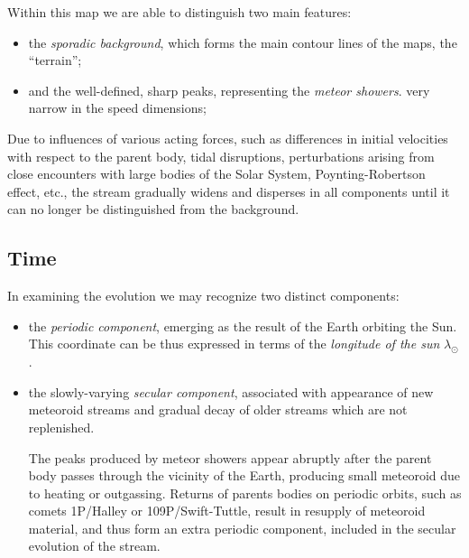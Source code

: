     \citep{balaz+2020}

    Within this map we are able to distinguish two main features:
    \begin{itemize}
        \item the \emph{sporadic background}, which forms the main contour lines of the maps, the ``terrain'';
        \item and the well-defined, sharp peaks, representing the \emph{meteor showers}. 
            very narrow in the speed dimensions;
    \end{itemize}
        
    Due to influences of various acting forces, such as differences
    in initial velocities with respect to the parent body, tidal disruptions, 
    perturbations arising from close encounters with large bodies of the Solar System,
    Poynting-Robertson effect, etc., the stream
    gradually widens and disperses in all components until it can no longer be distinguished from the background.

    \subsection{Time} \label{i}
        In examining the evolution we may recognize two distinct components:
        \begin{itemize}
            \item the \emph{periodic component}, emerging as the result of the Earth orbiting the Sun.
                This coordinate can be thus expressed in terms of the \emph{longitude of the sun} $\lambda_\odot$.

            \item the slowly-varying \emph{secular component}, associated with appearance of new meteoroid streams and gradual decay of older
                streams which are not replenished.

                The peaks produced by meteor showers appear abruptly after the parent body passes through the vicinity of the Earth,
                producing small meteoroid due to heating or outgassing.
                Returns of parents bodies on periodic orbits, such as comets 1P/Halley or 109P/Swift-Tuttle, result
                in resupply of meteoroid material, and thus form an extra periodic component, included in the secular evolution of the stream.

        \end{itemize}
